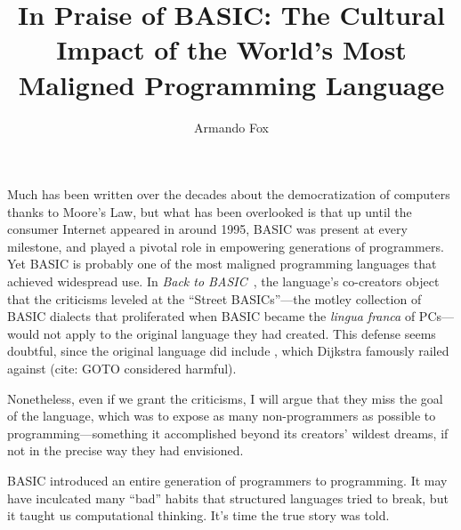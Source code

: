 \documentclass{article}
\title{In Praise of BASIC: The Cultural Impact of the World's Most
  Maligned Programming Language}
\author{Armando Fox}
\begin{document}

\maketitle




Much has been written over the decades about the democratization of
computers thanks to Moore's Law, but what has been overlooked is that up
until the consumer Internet appeared in around 1995, BASIC was present
at every milestone, and played a pivotal role in empowering generations
of programmers.
Yet BASIC is probably one of the most maligned programming languages
that achieved widespread use.
In \emph{Back to BASIC}~\cite{backtobasic}, the language's co-creators
object that the criticisms leveled at the ``Street BASICs''---the motley
collection of BASIC dialects that proliferated when BASIC became the
\emph{lingua franca} of PCs---would not apply to the original language
they had created.
This defense seems doubtful, since the original language did include
, which Dijkstra famously railed against (cite: GOTO
considered harmful).

Nonetheless, even if we grant the criticisms,
I will argue that they miss the goal of the
language, which was to expose as many non-programmers as possible to
programming---something it accomplished beyond its creators' wildest dreams,
if not in the precise way they had envisioned.

BASIC introduced an entire generation of
programmers to programming.  It may have inculcated many ``bad'' habits that
structured languages tried to break, but it taught us computational
thinking.    It's time the true story was told.
\end{document}

